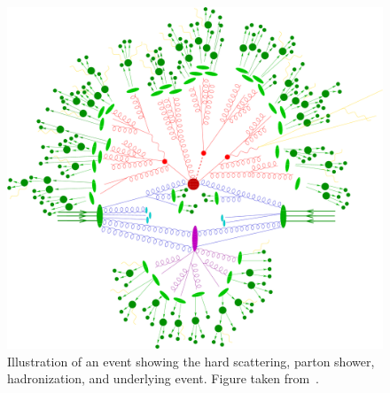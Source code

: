 \begin{figure}[ht]
  \centering
 \includegraphics[width=.9\textwidth]{event.png} 
 \caption{Illustration of an event showing the hard scattering, parton shower, hadronization, and underlying event. Figure taken from~\cite{Hoche:2014rga}.}
 \label{fig:event}
\end{figure}

